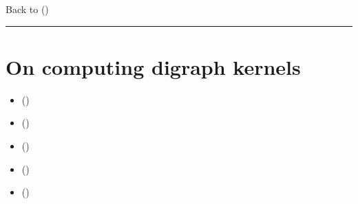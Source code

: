 \documentclass[a4paper,12pt,english]{sphinxhowto}
\begin{document}
Back to {\hyperref[\detokenize{tutorial:tutorial-label}]{}} ()


\bigskip\hrule\bigskip



\section{On computing digraph kernels}
\label{\detokenize{tutorial:on-computing-digraph-kernels}}\label{\detokenize{tutorial:kernel-tutorial-label}}
\begin{sphinxShadowBox}
\begin{itemize}
\item {} 
\label{\detokenize{tutorial:id310}}{\hyperref[\detokenize{tutorial:what-is-a-graph-kernel}]{}} ()

\item {} 
\label{\detokenize{tutorial:id311}}{\hyperref[\detokenize{tutorial:initial-and-terminal-kernels}]{}} ()

\item {} 
\label{\detokenize{tutorial:id312}}{\hyperref[\detokenize{tutorial:kernels-in-lateralized-digraphs}]{}} ()

\item {} 
\label{\detokenize{tutorial:id313}}{\hyperref[\detokenize{tutorial:computing-good-and-bad-choice-recommendations}]{}} ()

\item {} 
\label{\detokenize{tutorial:id314}}{\hyperref[\detokenize{tutorial:tractability}]{}} ()

\end{itemize}
\end{sphinxShadowBox}
\end{document}
